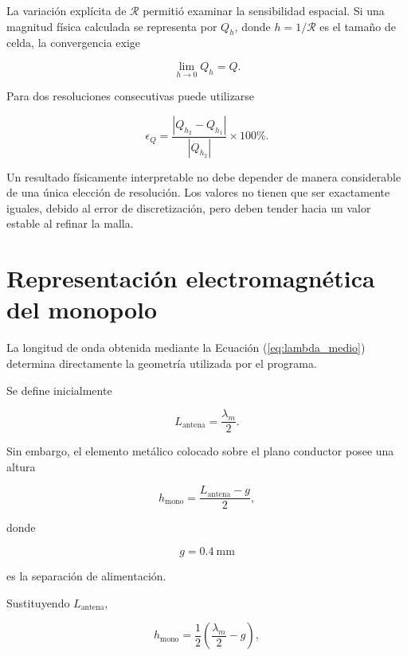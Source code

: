 La variación explícita de $\mathcal{R}$ permitió examinar la sensibilidad espacial. Si una magnitud física calculada se representa por $Q_h$, donde $h=1/\mathcal{R}$ es el tamaño de celda, la convergencia exige

\begin{equation}
\lim_{h\rightarrow0}Q_h
=
Q.
\end{equation}

Para dos resoluciones consecutivas puede utilizarse

\begin{equation}
\epsilon_Q
=
\frac{
|Q_{h_2}-Q_{h_1}|
}{
|Q_{h_2}|
}
\times100\%.
\label{eq:error_convergencia}
\end{equation}

Un resultado físicamente interpretable no debe depender de manera considerable de una única elección de resolución. Los valores no tienen que ser exactamente iguales, debido al error de discretización, pero deben tender hacia un valor estable al refinar la malla.

\section{Representación electromagnética del monopolo}

La longitud de onda obtenida mediante la Ecuación (\ref{eq:lambda_medio}) determina directamente la geometría utilizada por el programa.

Se define inicialmente

\begin{equation}
L_{\mathrm{antena}}
=
\frac{\lambda_m}{2}.
\end{equation}

Sin embargo, el elemento metálico colocado sobre el plano conductor posee una altura

\begin{equation}
h_{\mathrm{mono}}
=
\frac{L_{\mathrm{antena}}-g}{2},
\end{equation}

donde

\begin{equation}
g=0.4~\mathrm{mm}
\end{equation}

es la separación de alimentación.

Sustituyendo $L_{\mathrm{antena}}$,

\begin{equation}
h_{\mathrm{mono}}
=
\frac{1}{2}
\left(
\frac{\lambda_m}{2}-g
\right),
\end{equation}

